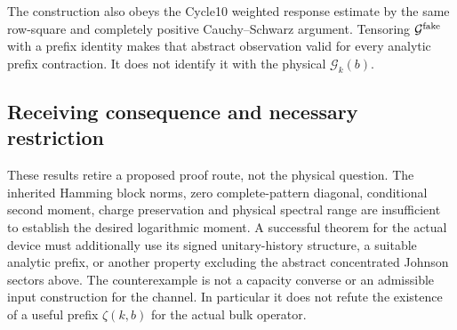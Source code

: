 The construction also obeys the Cycle10 weighted response estimate by
the same row-square and completely positive Cauchy--Schwarz argument.
Tensoring $\mathcal G^{\rm fake}$ with a prefix identity makes that
abstract observation valid for every analytic prefix contraction. It
does not identify it with the physical $\mathcal G_k(b)$.

\subsection{Receiving consequence and necessary restriction}

These results retire a proposed proof route, not the physical question.
The inherited Hamming block norms, zero complete-pattern diagonal,
conditional second moment, charge preservation and physical spectral
range are insufficient to establish the desired logarithmic moment.
A successful theorem for the actual device must additionally use its
signed unitary-history structure, a suitable analytic prefix, or another
property excluding the abstract concentrated Johnson sectors above.
The counterexample is not a capacity converse or an admissible input
construction for the channel. In particular it does not refute the
existence of a useful prefix $\zeta(k,b)$ for the actual bulk operator.
